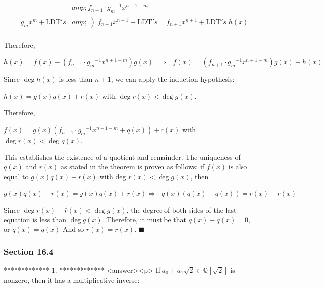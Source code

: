  $\quad \quad $\(\begin{array}{cc}
   &amp; f_{n+1}\cdot g_m{}^{-1}x^{n+1-m}\text{                  } \\
 g_mx^m+ \text{LDT}'s &amp; \overline{\left) f_{n+1}x^{n+1}\right.+ \text{LDT}'s\text{                    }}\underline{\text{   }f_{n+1}x^{n+1}+ \text{LDT}'s}\text{
                             }h(x) \\
\end{array}\)



Therefore,



  \(h(x) = f(x)-\left(f_{n+1}\cdot g_m{}^{-1}x^{n+1-m}\right) g(x)\text{  }\Rightarrow \text{  }f(x) = \left(f_{n+1}\cdot g_m{}^{-1}x^{n+1-m}\right)
g(x)+h(x)\text{  }\)



Since \(\deg  h (x)\) is less than \(n+1\), we can apply the induction hypothesis:



\(h(x) = g(x)q(x) + r(x)\) with  \(\deg  r(x) < \deg  g(x)\).



Therefore,



\(f(x) = g(x)\left(f_{n+1}\cdot g_m{}^{-1}x^{n+1-m}+ q(x)\right) + r(x)\)  with  \(\deg  r(x) < \deg  g(x)\).



This establishes the existence of a quotient and remainder. The uniqueness of \(q(x)\) and \(r(x)\) as stated in the theorem is proven as follows:
if \(f(x)\) is also equal to \(g(x)\bar{q}(x) + \bar{r}(x)\) with deg \(\bar{r}(x)<\deg  g(x)\), then



\(g(x)q(x) + r(x) = g(x) \bar{q}(x) +\overline{ r}(x) \Rightarrow \text{  }g(x) \left(\bar{q}(x)-q(x)\right)= r(x)-\bar{r}(x)\)



Since \(\deg  r(x) - \bar{r}(x) < \deg  g(x)\), the degree of both sides of the last equation is less than \(\deg  g(x)\). Therefore, it must be
that \(\bar{q}(x) - q(x) = 0\), or \(q(x) =\bar{q}(x)\) And so \(r(x) = \bar{r}(x)\).  $\blacksquare $ 


\subsubsection{Section 16.4}

*************
1.
*************
<answer><p> If \(a_0+ a_1\sqrt{2}\in \mathbb{Q}\left[\sqrt{2}\right]\) is nonzero, then it has a multiplicative inverse:



